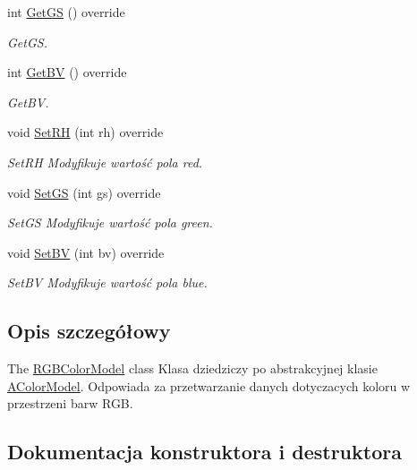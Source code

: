 \begin{DoxyCompactItemize}
int \mbox{\hyperlink{class_r_g_b_color_model_ab90ddb80c57a81ca93b6c6b2aec21a88}{Get\+GS}} () override
\begin{DoxyCompactList}\small\item\em Get\+GS. \end{DoxyCompactList}\item 
int \mbox{\hyperlink{class_r_g_b_color_model_af87d29172cf3dc37e8b67926c323d521}{Get\+BV}} () override
\begin{DoxyCompactList}\small\item\em Get\+BV. \end{DoxyCompactList}\item 
void \mbox{\hyperlink{class_r_g_b_color_model_a2cfefda5444f0b9479aca4b661f1790b}{Set\+RH}} (int rh) override
\begin{DoxyCompactList}\small\item\em Set\+RH Modyfikuje wartość pola red. \end{DoxyCompactList}\item 
void \mbox{\hyperlink{class_r_g_b_color_model_a0b48f8097e7edf4a5e28e101a62c671a}{Set\+GS}} (int gs) override
\begin{DoxyCompactList}\small\item\em Set\+GS Modyfikuje wartość pola green. \end{DoxyCompactList}\item 
void \mbox{\hyperlink{class_r_g_b_color_model_ad3fa9841c0fa4082e06a81a3bbf57988}{Set\+BV}} (int bv) override
\begin{DoxyCompactList}\small\item\em Set\+BV Modyfikuje wartość pola blue. \end{DoxyCompactList}\end{DoxyCompactItemize}


\subsection{Opis szczegółowy}
The \mbox{\hyperlink{class_r_g_b_color_model}{R\+G\+B\+Color\+Model}} class Klasa dziedziczy po abstrakcyjnej klasie \mbox{\hyperlink{class_a_color_model}{A\+Color\+Model}}. Odpowiada za przetwarzanie danych dotyczacych koloru w przestrzeni barw R\+GB. 

\subsection{Dokumentacja konstruktora i destruktora}
\mbox{\label{class_r_g_b_color_model_a60985479217d6c0f8dda2ec5d728a035}} 
